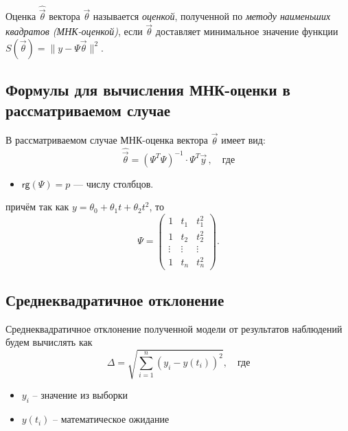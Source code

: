 \begin{defn}
    Оценка $\hat{\vec{\theta}}$ вектора $\vec{\theta}$ называется \emph{оценкой}, полученной по \emph{методу наименьших квадратов (МНК-оценкой)}, если $\vec{\theta}$ доставляет минимальное значение функции $S(\vec{\theta}) = \|y - \Psi \vec{\theta}\|^2$.
\end{defn}


\subsection{Формулы для вычисления МНК-оценки в рассматриваемом случае}

В рассматриваемом случае МНК-оценка вектора $\vec{\theta}$ имеет вид:
\begin{equation}
    \hat{\vec{\theta}} = (\Psi^T \Psi)^{-1} \cdot \Psi^T \vec{y}\,, \quad \text{где}
\end{equation}
\begin{itemize}
    \item $\mathsf{rg}(\Psi) = p$ --- числу столбцов.
\end{itemize}
причём так как $y = \theta_0 + \theta_1 t + \theta_2 t^2$, то
\begin{equation}
    \Psi = \begin{pmatrix}
        1      & t_1    & t_1^2  \\
        1      & t_2    & t_2^2  \\
        \vdots & \vdots & \vdots \\
        1      & t_n    & t_n^2
    \end{pmatrix}.
\end{equation}


\subsection{Среднеквадратичное отклонение}

Среднеквадратичное отклонение полученной модели от результатов наблюдений будем вычислять как
\begin{equation}
    \Delta = \sqrt{\sum_{i=1}^{n}\left(y_i - y(t_i)\right)^2}, \quad \text{где}
\end{equation}

\begin{itemize}
    \item $y_i$ – значение из выборки
    \item $y(t_i)$ – математическое ожидание
\end{itemize}



